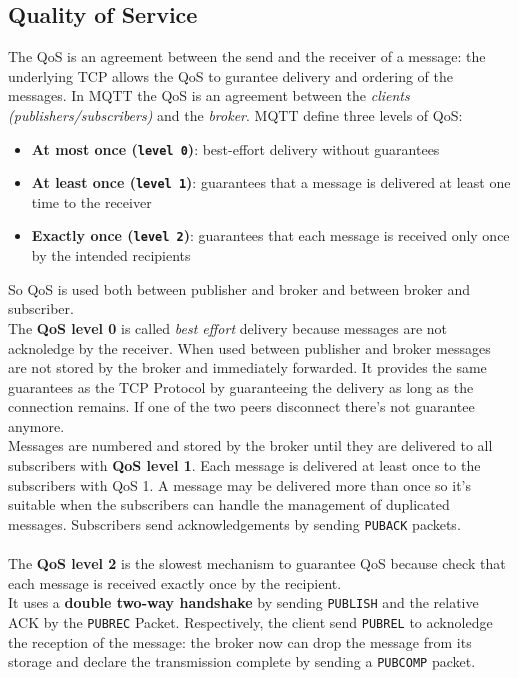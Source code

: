 \documentclass[10pt,a4paper]{report}
\theoremstyle{definition}
\begin{document}
\subsection{Quality of Service}\label{sec:quality-of-service}
The QoS is an agreement between the send and the receiver of a message: the underlying TCP allows the QoS to gurantee delivery and ordering of the messages.
In MQTT the QoS is an agreement between the \textit{clients (publishers/subscribers)} and the \textit{broker}.
MQTT define three levels of QoS:
\begin{itemize}
	\item 
	\textbf{At most once (\texttt{level 0})}: best-effort delivery without guarantees
	\item 
	\textbf{At least once (\texttt{level 1})}: guarantees that a message is delivered at least one time to the receiver
	\item 
	\textbf{Exactly once (\texttt{level 2})}: guarantees that each message is received only once by the intended recipients
	
\end{itemize}
So QoS is used both between publisher and broker and between broker and subscriber.\\
The \textbf{QoS level 0} is called \textit{best effort} delivery because messages are not acknoledge by the receiver. When used between publisher and broker messages are not stored by the broker and immediately forwarded.
It provides the same guarantees as the TCP Protocol by guaranteeing the delivery as long as the connection remains. If one of the two peers disconnect there's not guarantee anymore.\\
Messages are numbered and stored by the broker until they are delivered to all subscribers with \textbf{QoS level 1}. Each message is delivered at least once to the subscribers with QoS 1. A message may be delivered more than once so it's suitable when the subscribers can handle the management of duplicated messages.
Subscribers send acknowledgements by sending \texttt{PUBACK} packets.\\\\
The \textbf{QoS level 2} is the slowest mechanism to guarantee QoS because check that each message is received exactly once by the recipient.\\ 
It uses a \textbf{double two-way handshake} by sending \texttt{PUBLISH} and the relative ACK by the \texttt{PUBREC} Packet. Respectively, the client send \texttt{PUBREL} to acknoledge the reception of the message: the broker now can drop the message from its storage and declare the transmission complete by sending a \texttt{PUBCOMP} packet.\\
\end{document}
